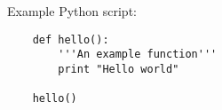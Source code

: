 \documentclass{article}
\begin{document}
Example Python script:

\begin{verbatim}
    def hello():
        '''An example function'''
        print "Hello world"

    hello()
\end{verbatim}
\end{document}
